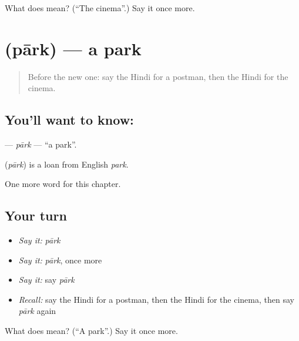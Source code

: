 \begin{tcolorbox}[breakable,colback=teal!4,colframe=teal!35!black,title={Before you move on}]
What does  mean? (\textquotedblleft{}The cinema\textquotedblright{}.) Say it once more.
\end{tcolorbox}
\section[\texorpdfstring{\hi{पार्क} (pārk)}{पार्क (pārk)}]{ (pārk) — a park}

\label{lesson:HI-C187-park}



\begin{quote}
Before the new one: say the Hindi for a postman, then the Hindi for the cinema.
\end{quote}

\subsection*{You'll want to know: }
\textbf{} — \emph{pārk} — \textquotedblleft{}a park\textquotedblright{}.

\begin{cousinweb}
\textbf{} (\emph{pārk}) is a loan from English \emph{park}.
\end{cousinweb}

\begin{grammarlens}[title={What you've built}]
One more word for this chapter.
\end{grammarlens}

\subsection*{Your turn}
\begin{itemize}
\raggedright
  \item \emph{Say it:} \emph{pārk}
  \item \emph{Say it:} \emph{pārk}, once more
  \item \emph{Say it:} say \emph{pārk}
  \item \emph{Recall:} say the Hindi for a postman, then the Hindi for the cinema, then say \emph{pārk} again
\end{itemize}

\begin{tcolorbox}[breakable,colback=teal!4,colframe=teal!35!black,title={Before you move on}]
What does  mean? (\textquotedblleft{}A park\textquotedblright{}.) Say it once more.
\end{tcolorbox}
